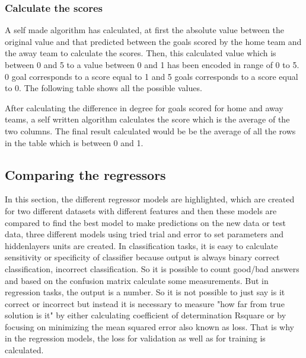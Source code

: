 \subsubsection{Calculate the scores}

A self made algorithm has calculated, at first the absolute value between the original value 
and that predicted between the goals scored by the home team and the away team to calculate the scores.
Then, this calculated value which is between 0 and 5 to a value between 0 and 1 has been encoded in range of 0 to 5. 
0 goal corresponds to a score equal to 1 and 5 goals corresponds to a score equal to 0.
The following table shows all the possible values.


\begin{table}[H]
    \centering
    \caption{Calculate the degree difference}
    \label{table:degreedifferencecalculate}
\end{table}

After calculating the difference in degree for goals scored for home and away teams, a self written algorithm calculates the score which is the average of the two columns. The final result calculated would be be the average of all the rows in the table which is between 0 and 1.

\subsection{Comparing the regressors}
In this section, the different regressor models are highlighted, which are created for two different datasets with different features and then these models are compared to find the best model to make predictions on the new data or test data, three different models using tried trial and error to set parameters and hiddenlayers units are created.\newline 
In classification tasks, it is easy to calculate sensitivity or specificity of classifier because output is always binary {correct classification, incorrect classification}. So it is possible to count good/bad answers and based on the confusion matrix calculate some measurements. But in regression tasks, the output is a number. So it is not possible to just say is it correct or incorrect but instead it is necessary to measure "how far from true solution is it" by either calculating coefficient of determination Rsquare or by focusing on minimizing the mean squared error also known as loss. That is why in the regression models, the loss for validation as well as for training is calculated.
